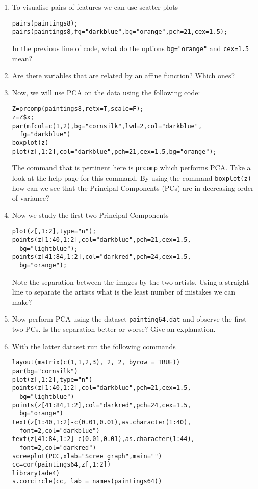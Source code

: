 \documentclass[a4paper,10pt]{article}
\begin{document}
\begin{enumerate}
\item To visualise pairs of features we can use scatter plots 
\begin{lstlisting}
pairs(paintings8);
pairs(paintings8,fg="darkblue",bg="orange",pch=21,cex=1.5);
\end{lstlisting}
In the previous line of code, what do the options \texttt{bg="orange"} and \texttt{cex=1.5} mean?
\item Are there variables that are related by an affine function? Which ones? 
\item Now, we will use PCA on the data using the following code: 
\begin{lstlisting} 
Z=prcomp(paintings8,retx=T,scale=F);
z=Z$x;
par(mfcol=c(1,2),bg="cornsilk",lwd=2,col="darkblue",
  fg="darkblue")
boxplot(z)
plot(z[,1:2],col="darkblue",pch=21,cex=1.5,bg="orange");
\end{lstlisting}
The command that is pertinent here is \texttt{prcomp} which performs PCA. Take a look at the help page for this command. By using the command  \texttt{boxplot(z)} how can we see that the Principal Components (PCs) are in decreasing order of variance?
\item Now we study the first two Principal Components 
\begin{lstlisting} 
plot(z[,1:2],type="n");
points(z[1:40,1:2],col="darkblue",pch=21,cex=1.5,
  bg="lightblue");
points(z[41:84,1:2],col="darkred",pch=24,cex=1.5,
  bg="orange");
\end{lstlisting}
Note the separation between the images by the two artists. Using a straight line to separate the artists what is the least number of mistakes we can make? 
\item Now perform PCA using the dataset \texttt{painting64.dat} and observe the first two PCs. Is the separation better or worse? Give an explanation. 
\item With the latter dataset run the following commands 
\begin{lstlisting} 
layout(matrix(c(1,1,2,3), 2, 2, byrow = TRUE))
par(bg="cornsilk")
plot(z[,1:2],type="n")
points(z[1:40,1:2],col="darkblue",pch=21,cex=1.5,
  bg="lightblue")
points(z[41:84,1:2],col="darkred",pch=24,cex=1.5,
  bg="orange")
text(z[1:40,1:2]-c(0.01,0.01),as.character(1:40),
  font=2,col="darkblue")
text(z[41:84,1:2]-c(0.01,0.01),as.character(1:44),
  font=2,col="darkred")
screeplot(PCC,xlab="Scree graph",main="")
cc=cor(paintings64,z[,1:2])
library(ade4)
s.corcircle(cc, lab = names(paintings64))
\end{lstlisting}

\end{enumerate}
\end{document}
